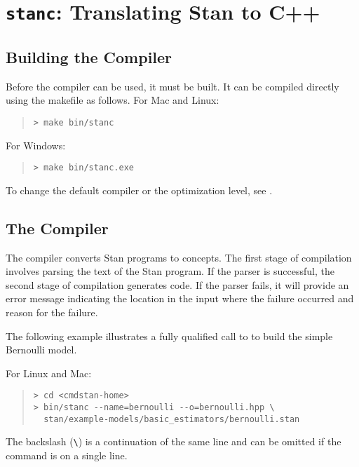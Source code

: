 \chapter{{\tt\bfseries stanc}: Translating Stan to C++}\label{stanc.chapter}

\section{Building the \stanc Compiler}

Before the \stanc compiler can be used, it must be built. It can be
compiled directly using the makefile as follows. For Mac and Linux:
%
\begin{quote}
\begin{Verbatim}[fontshape=sl]
> make bin/stanc
\end{Verbatim}
\end{quote}
%
For Windows:
%
\begin{quote}
\begin{Verbatim}[fontshape=sl]
> make bin/stanc.exe
\end{Verbatim}
\end{quote}
%
To change the default compiler or the optimization level, see
.

\section{The \stanc Compiler}

The \stanc compiler converts Stan programs to \Cpp concepts. The
first stage of compilation involves parsing the text of the Stan
program.  If the parser is successful, the second stage of compilation
generates \Cpp code.  If the parser fails, it will provide an error
message indicating the location in the input where the failure
occurred and reason for the failure.

The following example illustrates a fully qualified call to \stanc
to build the simple Bernoulli model. 

For Linux and Mac:
%
\begin{quote}
\begin{Verbatim}[fontshape=sl]
> cd <cmdstan-home>
> bin/stanc --name=bernoulli --o=bernoulli.hpp \
  stan/example-models/basic_estimators/bernoulli.stan 
\end{Verbatim}
\end{quote}
%
The backslash (\Verb|\|) is a continuation of the same line and can be
omitted if the command is on a single line.

